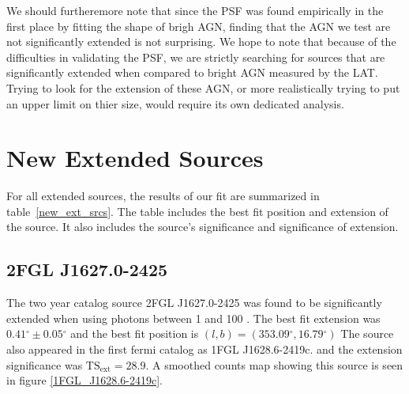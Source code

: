 \documentclass[12pt,preprint]{aastex}
\newcommand{\gev}{\text{GeV}\xspace}
\newcommand{\tsext}{{\ensuremath{\text{TS}_\text{ext}}}\xspace}
\renewcommand{\deg}{\ensuremath{^\circ}\xspace}
\begin{document}
We should furtheremore note that since the PSF was found empirically in
the first place by fitting the shape of brigh AGN, finding that the AGN we
test are not significantly extended is not surprising.  We hope to note
that because of the difficulties in validating the PSF, we are strictly
searching for sources that are significantly extended when compared to
bright AGN measured by the LAT. Trying to look for the extension of these
AGN, or more realistically trying to put an upper limit on thier size,
would require its own dedicated analysis.

\section{New Extended Sources}


For all extended sources, the results of our fit are summarized in
table~\ref{new_ext_srcs}. The table includes the best fit position
and extension of the source. It also includes the source's significance
and significance of extension.


\subsection{2FGL J1627.0-2425}


The two year catalog source 2FGL J1627.0-2425 was found to be significantly
extended when using photons between 1 \gev and 100 \gev.  The best
fit extension was $0.41\deg\pm0.05\deg$ and the best fit position is
$(l,b)=(353.09\deg, 16.79\deg)$ The source also appeared in the first
fermi catalog as 1FGL J1628.6-2419c.  and the extension significance
was $\tsext=28.9$.  A smoothed counts map showing this source is seen
in figure \ref{1FGL_J1628.6-2419c}.
\end{document}
